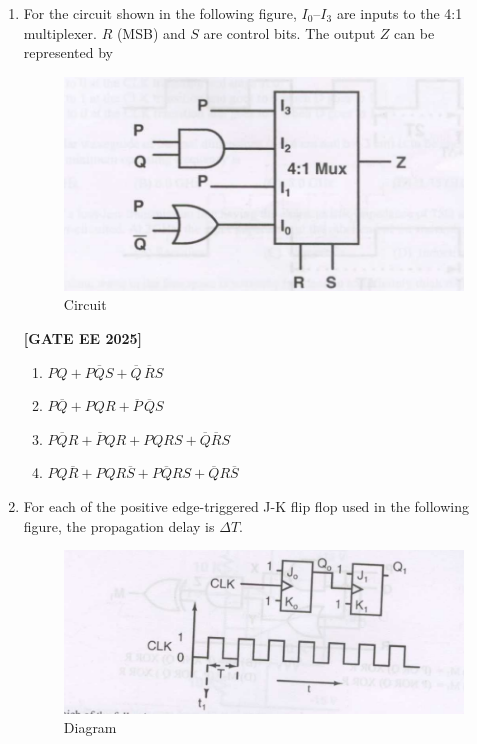 \documentclass[12pt]{article}
\begin{document}
\begin{enumerate}[leftmargin=*, label=\textbf{Q.\arabic*:}]
\noindent \textbf{[GATE EE 2025]}
\begin{multicols}{2}
\begin{enumerate}
  \item $M_1 = (P \text{ OR } Q) \text{ XOR } R$
  \item $M_1 = (P \text{ AND } Q) \text{ XOR } R$
  \item $M_1 = (P \text{ NOR } Q) \text{ XOR } R$
  \item $M_1 = (P \text{ XOR } Q) \text{ XOR } R$
\end{enumerate}
\end{multicols}

\item For the circuit shown in the following figure, $I_0$–$I_3$ are inputs to the 4:1 multiplexer. $R$ (MSB) and $S$ are control bits. The output $Z$ can be represented by
\begin{figure}[H]\centering
\includegraphics[width=0.6\columnwidth]{figs/q58.png}
\caption{Circuit}
\label{fig:q58}
\end{figure}
 
\noindent \textbf{[GATE EE 2025]}
\begin{multicols}{2}
\begin{enumerate}
  \item $PQ + P\overline{Q}S + \overline{Q}\, \overline{R}S$
  \item $P\overline{Q} + PQR + \overline{P}\, \overline{Q}S$
  \item $P\overline{Q}R + \overline{P}QR + P Q R S + \overline{Q}\overline{R}S$
  \item $P Q \overline{R} + P Q R \overline{S} + P\overline{Q}RS + \overline{Q}R\overline{S}$
\end{enumerate}
\end{multicols}

\item For each of the positive edge-triggered J-K flip flop used in the following figure, the propagation delay is $\Delta T$.

\begin{figure}[H]\centering
\includegraphics[width=0.6\columnwidth]{figs/q59a.png}
\caption{Diagram}
\label{fig:q59a}
\end{figure}


\end{enumerate}
\end{document}
